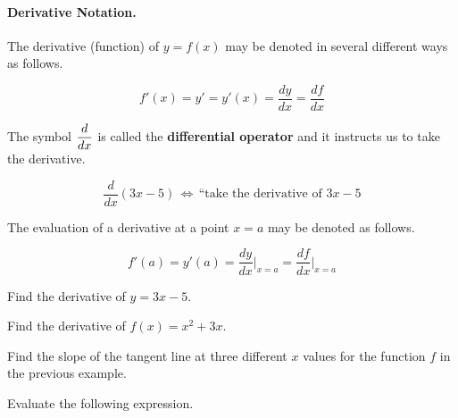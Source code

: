 \documentclass[12pt]{article}
\begin{document}
\vspace{5mm}


\vspace{5mm}


\newpage

\paragraph{Derivative Notation.} The derivative (function) of $y=f(x)$ may be denoted in several different ways as follows.

$$f'(x)=y'=y'(x)=\frac{dy}{dx}=\frac{df}{dx}$$

\vspace{3mm}

The symbol $\displaystyle\frac{d}{dx}$ is called the \textbf{differential operator} and it instructs us to take the derivative. 

$$\frac{d}{dx}(3x-5)\,\Longleftrightarrow\,\text{``take the derivative of }3x-5$$

\vspace{3mm}

The evaluation of a derivative at a point $x=a$ may be denoted as follows.

$$f'(a)=y'(a)=\frac{dy}{dx}\bigg|_{x=a}=\frac{df}{dx}\bigg|_{x=a}$$

\vspace{3mm}

\Example Find the derivative of $y=3x-5$.

\vspace{45mm}

\Example Find the derivative of $f(x)=x^2+3x$.

\vspace{50mm}

\Example Find the slope of the tangent line at three different $x$ values for the function $f$ in the previous example.

\newpage

\Example Evaluate the following expression.

\vspace{5mm}
\end{document}

